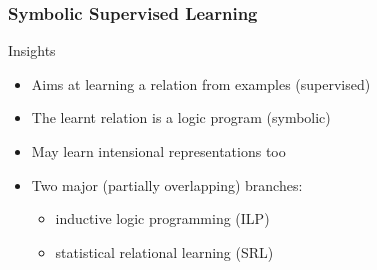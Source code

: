 \documentclass[presentation]{beamer}\mode<presentation>{\usetheme{AMSBolognaFC}}
\begin{document}
\begin{frame}[allowframebreaks]
\frametitle{Symbolic Supervised Learning}

    \begin{block}{Insights}
        \begin{itemize}
            \item Aims at learning a \alert{relation from examples} (supervised)
            \item The learnt relation is a \alert{logic program} (symbolic)
            \item May learn \alert{intensional} representations too
            \item Two major (partially overlapping) branches:
            \begin{itemize}
                \item inductive logic programming (ILP) \cite{Muggleton1991}
                \item statistical relational learning (SRL) \cite{DeRaedt2010,RaedtK04}
            \end{itemize}
        \end{itemize}
    \end{block}


\end{frame}
\end{document}
